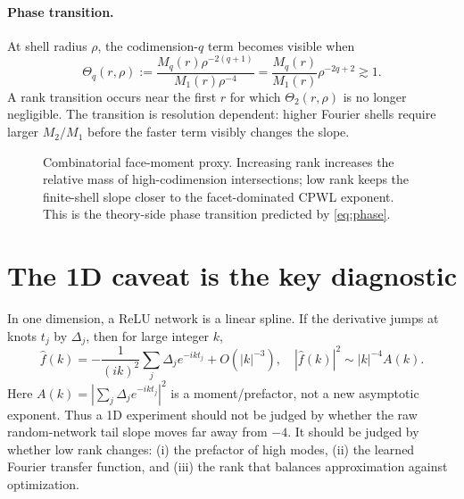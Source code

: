 \documentclass[10pt,twocolumn]{article}
\newcommand{\1}{\mathbf{1}}
\newcommand{\wh}{\widehat}
\begin{document}
\paragraph{Phase transition.}
At shell radius $\rho$, the codimension-$q$ term becomes visible when
\begin{equation}\label{eq:phase}
\Theta_q(r,\rho):=\frac{M_q(r)\rho^{-2(q+1)}}{M_1(r)\rho^{-4}}
=\frac{M_q(r)}{M_1(r)}\rho^{-2q+2}\gtrsim 1.
\end{equation}
A rank transition occurs near the first $r$ for which $\Theta_2(r,\rho)$ is no longer negligible.  The transition is resolution dependent: higher Fourier shells require larger $M_2/M_1$ before the faster term visibly changes the slope.

\begin{figure}[t]
\centering
{}
\caption{Combinatorial face-moment proxy.  Increasing rank increases the relative mass of high-codimension intersections; low rank keeps the finite-shell slope closer to the facet-dominated CPWL exponent.  This is the theory-side phase transition predicted by \eqref{eq:phase}.}
\label{fig:theoryproxy}
\end{figure}

\section{The 1D caveat is the key diagnostic}
In one dimension, a ReLU network is a linear spline.  If the derivative jumps at knots $t_j$ by $\Delta_j$, then for large integer $k$,
\begin{equation}\label{eq:oned}
\wh f(k)= -\frac{1}{(ik)^2}\sum_j \Delta_j e^{-ik t_j}+O(|k|^{-3}),
\quad
|\wh f(k)|^2\sim |k|^{-4}A(k).
\end{equation}
Here $A(k)=|\sum_j\Delta_j e^{-ik t_j}|^2$ is a moment/prefactor, not a new asymptotic exponent.  Thus a 1D experiment should not be judged by whether the raw random-network tail slope moves far away from $-4$.  It should be judged by whether low rank changes: (i) the prefactor of high modes, (ii) the learned Fourier transfer function, and (iii) the rank that balances approximation against optimization.
\end{document}
